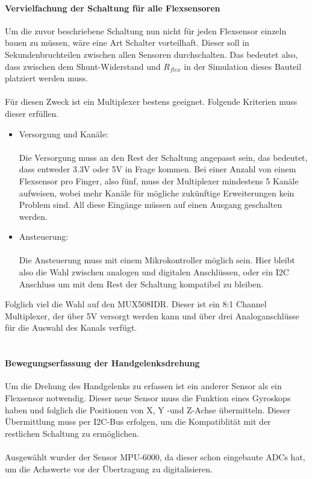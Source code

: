 \documentclass[titlepage,12pt,twoside]{article}
\begin{document}
\paragraph{Vervielfachung der Schaltung für alle Flexsensoren}
\hfill \break
\hfill \break
Um die zuvor beschriebene Schaltung nun nicht für jeden Flexsensor einzeln bauen zu müssen, wäre eine Art Schalter vorteilhaft.
Dieser soll in Sekundenbruchteilen zwischen allen Sensoren durchschalten. Das bedeutet also, dass zwischen dem Shunt-Widerstand
und $R_{flex}$ in der Simulation dieses Bauteil platziert werden muss. \\
\\
Für diesen Zweck ist ein Multiplexer bestens geeignet. Folgende Kriterien muss dieser erfüllen.
\begin{itemize}
	\item Versorgung und Kanäle: \\
		  \\ 
		  Die Versorgung muss an den Rest der Schaltung angepasst sein, das bedeutet, dass entweder 3.3V oder 5V in Frage kommen.
		  Bei einer Anzahl von einem Flexsensor pro Finger, also fünf, muss der Multiplexer mindestens 5 Kanäle aufweisen, wobei 
		  mehr Kanäle für mögliche zukünftige Erweiterungen kein Problem sind. All diese Eingänge müssen auf einen Ausgang geschalten
		  werden.
	\item Ansteuerung: \\
		  \\ 
		  Die Ansteuerung muss mit einem Mikrokontroller möglich sein. Hier bleibt also die Wahl zwischen analogen und digitalen 
		  Anschlüssen, oder ein I2C Anschluss um mit dem Rest der Schaltung kompatibel zu bleiben.
\end{itemize}
Folglich viel die Wahl auf den MUX508IDR. Dieser ist ein 8:1 Channel Multiplexer, der über 5V versorgt werden kann und über drei 
Analoganschlüsse für die Auswahl des Kanals verfügt. \\
\\
\paragraph{Bewegungserfassung der Handgelenksdrehung}
\hfill \break
\hfill \break
Um die Drehung des Handgelenks zu erfassen ist ein anderer Sensor als ein Flexsensor notwendig. Dieser neue Sensor muss die 
Funktion eines Gyroskops haben und folglich die Positionen von X, Y -und Z-Achse übermitteln. Dieser Übermittlung muss per
I2C-Bus erfolgen, um die Kompatiblität mit der restlichen Schaltung zu ermöglichen. \\
\\
Ausgewählt wurder der Sensor MPU-6000, da dieser schon eingebaute ADCs hat, um die Achswerte vor der Übertragung zu digitalisieren. \\
\\
\end{document}
